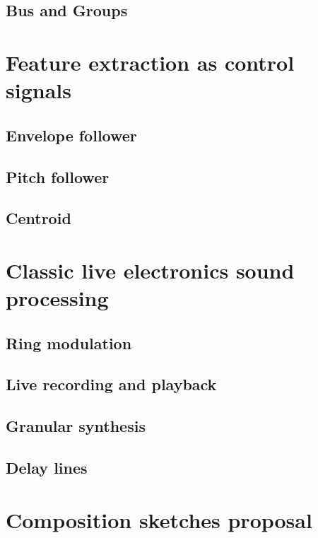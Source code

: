 \subsection{Bus and Groups}\label{bus-and-groups}

\section{Feature extraction as control signals}\label{feature-extraction-as-control-signals}
\subsection{Envelope follower}\label{envelope-follower}
\subsection{Pitch follower}\label{pitch-follower}
\subsection{Centroid}\label{centroid}

\section{Classic live electronics sound processing}\label{classic-live-electronics-sound-processing}
\subsection{Ring modulation}\label{ring-modulation}
\subsection{Live recording and playback}\label{live-recording-and-playback}
\subsection{Granular synthesis}\label{granular-synthesis}
\subsection{Delay lines}\label{delay-lines}

\section{Composition sketches proposal}\label{composition-sketches-proposal}
